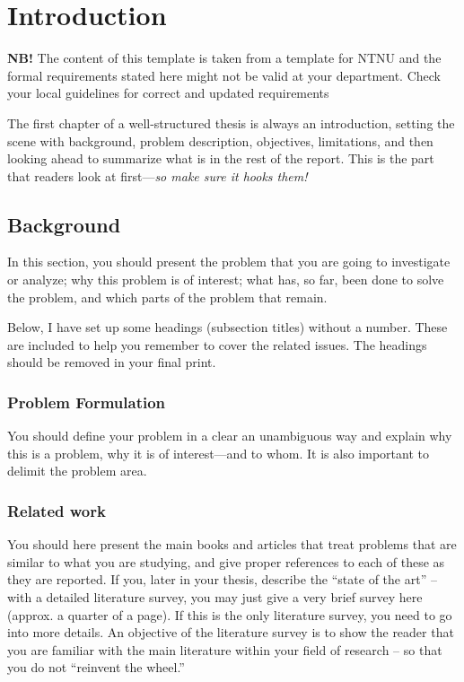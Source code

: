 \documentclass[../Main/thesis.tex]{subfiles}
\begin{document}
\chapter{Introduction}
\label{ch:introduction}
{\large{\color{red}\textbf{NB!} The content of this template is taken from a template for NTNU and the formal requirements stated here might not be valid at your department. Check your local guidelines for correct and updated requirements}}

The first chapter of a well-structured thesis is always an introduction, setting the scene with background, problem description, objectives, limitations, and then looking ahead to summarize what is in the rest of the report. 
This is the part that readers look at first---\emph{so make sure it hooks them!}

\section{Background}
\label{sec:background}
In this section, you should present the problem that you are going to investigate or analyze; why this problem is of interest; what has, so far, been done to solve the problem, and which parts of the problem that remain.

{\color{red}Below, I have set up some headings (subsection titles) without a number. 
These are included to help you remember to cover the related issues. 
The headings should be removed in your final print.}
\subsection*{Problem Formulation}
You should define your problem in a clear an unambiguous way and explain why this is a problem, why it is of interest---and to whom. 
It is also important to delimit the problem area.
\subsection*{Related work}
You should here present the main books and articles that treat problems that are similar to what  you are studying, and give proper references to each of these as they are reported. 
If you,  later in your thesis, describe the ``state of the art'' -- with a detailed literature survey, you may just give a very brief survey here (approx. a quarter of a page). 
If this is the only literature survey, you need to go into more details. 
An objective of the literature survey is to show the reader that you are familiar with the main literature within your field of research -- so that you do not ``reinvent the wheel.''
\end{document}
